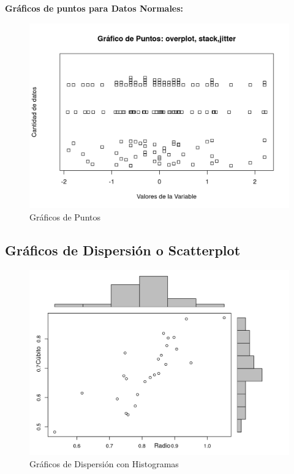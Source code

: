 \documentclass[12pt,a4paper,]{book}
\numberwithin{dummy}{section}
\theoremstyle{ocrenumbox}
\theoremstyle{ocrenumbox}
\theoremstyle{ocrenumbox}
\theoremstyle{ocrenumbox}
\theoremstyle{ocrenum}
\begin{document}
\textbf{Gráficos de puntos para Datos Normales:}

\begin{figure}[H]

{\centering \includegraphics[width=0.8\linewidth]{figurasR/grafica1b-1} 

}

\caption{Gráficos de Puntos}\label{fig:grafica1b}
\end{figure}

\hypertarget{gruxe1ficos-de-dispersiuxf3n-o-scatterplot}{%
\subsection{Gráficos de Dispersión o
Scatterplot}\label{gruxe1ficos-de-dispersiuxf3n-o-scatterplot}}

\begin{figure}[H]

{\centering \includegraphics[width=0.8\linewidth]{figurasR/grafica1c-1} 

}

\caption{Gráficos de Dispersión con Histogramas}\label{fig:grafica1c}
\end{figure}
\end{document}
